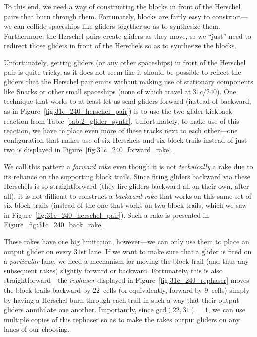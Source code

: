 To this end, we need a way of constructing the blocks in front of the Herschel pairs that burn through them. Fortunately, blocks are fairly easy to construct---we can collide spaceships like gliders together so as to synthesize them. Furthermore, the Herschel pairs create gliders as they move, so we ``just'' need to redirect those gliders in front of the Herschels so as to synthesize the blocks.

Unfortunately, getting gliders (or any other spaceships) in front of the Herschel pair is quite tricky, as it does not seem like it should be possible to reflect the gliders that the Herschel pair emits without making use of stationary components like Snarks or other small spaceships (none of which travel at $31c/240$). One technique that works to at least let us send gliders forward (instead of backward, as in Figure~\ref{fig:31c_240_herschel_pair}) is to use the two-glider kickback reaction from Table~\ref{tab:2_glider_synth}. Unfortunately, to make use of this reaction, we have to place even more of these tracks next to each other---one configuration that makes use of six Herschels and six block trails instead of just two is displayed in Figure~\ref{fig:31c_240_forward_rake}.

We call this pattern a \emph{forward rake} even though it is not \emph{technically} a rake due to its reliance on the supporting block trails. Since firing gliders backward via these Herschels is so straightforward (they fire gliders backward all on their own, after all), it is not difficult to construct a \emph{backward rake} that works on this same set of six block trails (instead of the one that works on two block trails, which we saw in Figure~\ref{fig:31c_240_herschel_pair}). Such a rake is presented in Figure~\ref{fig:31c_240_back_rake}.

These rakes have one big limitation, however---we can only use them to place an output glider on every $31$st lane. If we want to make sure that a glider is fired on a \emph{particular} lane, we need a mechanism for moving the block trail (and thus any subsequent rakes) slightly forward or backward. Fortunately, this is also straightforward---the \emph{rephaser} displayed in Figure~\ref{fig:31c_240_rephaser} moves the block trails backward by $22$~cells (or equivalently, forward by $9$~cells) simply by having a Herschel burn through each trail in such a way that their output gliders annihilate one another. Importantly, since $\mathrm{gcd}(22,31) = 1$, we can use multiple copies of this rephaser so as to make the rakes output gliders on any lanes of our choosing.

